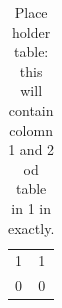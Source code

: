 \begin{table}[]
\centering
\begin{tabular}{ll}
1 & 1 \\
0 & 0
\end{tabular}
\caption{Place holder table: this will contain colomn 1 and 2 od table in 1 in \cite{gw150914PEseobnrv3} exactly.}
\label{my-label}
\end{table}








